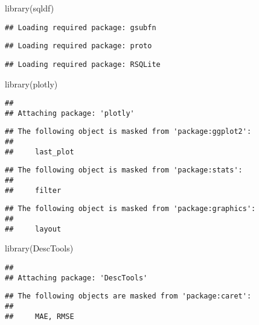 \documentclass[
]{article}
\newenvironment{Shaded}{\begin{snugshade}}{\end{snugshade}}
\newcommand{\FunctionTok}[1]{\textcolor[rgb]{0.00,0.00,0.00}{#1}}
\newcommand{\NormalTok}[1]{#1}
\begin{document}
\begin{Shaded}
\begin{Highlighting}[]
\FunctionTok{library}\NormalTok{(sqldf)}
\end{Highlighting}
\end{Shaded}

\begin{verbatim}
## Loading required package: gsubfn
\end{verbatim}

\begin{verbatim}
## Loading required package: proto
\end{verbatim}

\begin{verbatim}
## Loading required package: RSQLite
\end{verbatim}

\begin{Shaded}
\begin{Highlighting}[]
\FunctionTok{library}\NormalTok{(plotly)}
\end{Highlighting}
\end{Shaded}

\begin{verbatim}
## 
## Attaching package: 'plotly'
\end{verbatim}

\begin{verbatim}
## The following object is masked from 'package:ggplot2':
## 
##     last_plot
\end{verbatim}

\begin{verbatim}
## The following object is masked from 'package:stats':
## 
##     filter
\end{verbatim}

\begin{verbatim}
## The following object is masked from 'package:graphics':
## 
##     layout
\end{verbatim}

\begin{Shaded}
\begin{Highlighting}[]
\FunctionTok{library}\NormalTok{(DescTools)}
\end{Highlighting}
\end{Shaded}

\begin{verbatim}
## 
## Attaching package: 'DescTools'
\end{verbatim}

\begin{verbatim}
## The following objects are masked from 'package:caret':
## 
##     MAE, RMSE
\end{verbatim}
\end{document}
